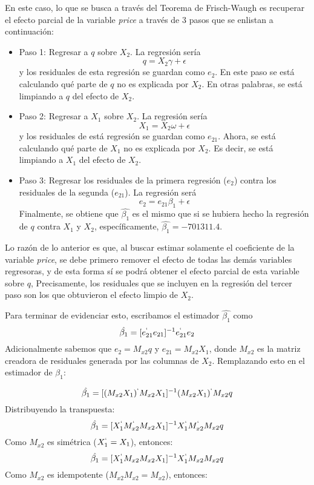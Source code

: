 \documentclass[
]{article}
\begin{document}
En este caso, lo que se busca a través del Teorema de Frisch-Waugh es
recuperar el efecto parcial de la variable \emph{price} a través de 3
pasos que se enlistan a continuación:

\begin{itemize}
\item
  Paso 1: Regresar a \(q\) sobre \(X_{2}\). La regresión sería \[
  q=X_{2}\gamma+\epsilon
  \] y los residuales de esta regresión se guardan como \(e_{2}\). En
  este paso se está calculando qué parte de \(q\) no es explicada por
  \(X_{2}\). En otras palabras, se está limpiando a \(q\) del efecto de
  \(X_{2}\).
\item
  Paso 2: Regresar a \(X_{1}\) sobre \(X_{2}\). La regresión sería \[
  X_{1}=X_{2}\omega+\epsilon
  \] y los residuales de está regresión se guardan como \(e_{21}\).
  Ahora, se está calculando qué parte de \(X_{1}\) no es explicada por
  \(X_{2}\). Es decir, se está limpiando a \(X_{1}\) del efecto de
  \(X_{2}\).
\item
  Paso 3: Regresar los residuales de la primera regresión (\(e_{2}\))
  contra los residuales de la segunda (\(e_{21}\)). La regresión será \[
  e_{2}=e_{21}\beta_{1}+\epsilon
  \] Finalmente, se obtiene que \(\hat{\beta_{1}}\) es el mismo que si
  se hubiera hecho la regresión de \(q\) contra \(X_{1}\) y \(X_{2}\),
  específicamente, \(\hat{\beta_{1}} = -701311.4\).
\end{itemize}

Lo razón de lo anterior es que, al buscar estimar solamente el
coeficiente de la variable \emph{price}, se debe primero remover el
efecto de todas las demás variables regresoras, y de esta forma sí se
podrá obtener el efecto parcial de esta variable sobre \(q\),
Precisamente, los residuales que se incluyen en la regresión del tercer
paso son los que obtuvieron el efecto limpio de \(X_{2}\).

Para terminar de evidenciar esto, escribamos el estimador
\(\hat{\beta_{1}}\) como \[
\hat{\beta_{1}}= [e^{`}_{21} e_{21}]^{-1} e^{`}_{21} e_{2}
\] Adicionalmente sabemos que \(e_{2}=M_{x2} q\) y
\(e_{21}=M_{x2}X_{1}\), donde \(M_{x2}\) es la matriz creadora de
residuales generada por las columnas de \(X_{2}\). Remplazando esto en
el estimador de \(\beta_1\):

\[
\hat{\beta_{1}}=[(M_{x2}X_{1})^{`} M_{x2}X_{1} ]^{-1} (M_{x2}X_{1})^{`} M_{x2} q
\] Distribuyendo la transpuesta: \[
\hat{\beta_{1}}=[X_{1}^{`}M_{x2}^{`} M_{x2}X_{1} ]^{-1} X_{1}^{`}M_{x2}^{`} M_{x2} q
\] Como \(M_{x2}\) es simétrica (\(X_{1}^{`}=X_{1}\)), entonces: \[
\hat{\beta_{1}}=[X_{1}^{`}M_{x2} M_{x2}X_{1} ]^{-1} X_{1}^{`}M_{x2} M_{x2} q
\] Como \(M_{x2}\) es idempotente (\(M_{x2}M_{x2}=M_{x2}\)), entonces:
\end{document}
